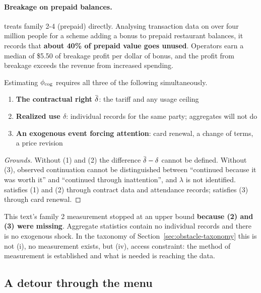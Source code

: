 \paragraph{Breakage on prepaid balances.}

\cite{nber2026pnbl} treats family 2-4 (prepaid) directly. Analysing transaction data on over
four million people for a scheme adding a bonus to prepaid restaurant balances, it records
that \textbf{about 40\% of prepaid value goes unused}. Operators earn a median of \$5.50 of
breakage profit per dollar of bonus, and the profit from breakage exceeds the revenue from
increased spending.

\begin{proposition}
\label{prop:phicog-requirements}
Estimating $\phi_{\rm cog}$ requires all three of the following simultaneously.
\begin{enumerate}[label=(\arabic*)]
\item \textbf{The contractual right $\dbar$}: the tariff and any usage ceiling
\item \textbf{Realized use $\delta$}: individual records for the same party; aggregates will not do
\item \textbf{An exogenous event forcing attention}: card renewal, a change of terms, a price revision
\end{enumerate}
\end{proposition}

\begin{proof}[Grounds]
Without (1) and (2) the difference $\dbar-\delta$ cannot be defined. Without (3), observed
continuation cannot be distinguished between ``continued because it was worth it'' and
``continued through inattention'', and $\lambda$ is not identified.
\cite{dellavigna2006} satisfies (1) and (2) through contract data and attendance records;
\cite{einav2025} satisfies (3) through card renewal.
\end{proof}

This text's family 2 measurement stopped at an upper bound \textbf{because (2) and (3) were
missing}. Aggregate statistics contain no individual records and there is no exogenous shock.
In the taxonomy of Section~\ref{sec:obstacle-taxonomy} this is not (i), no measurement exists,
but (iv), access constraint: the method of measurement is established and what is needed is
reaching the data.

\subsection{A detour through the menu}
\label{sec:phicog-detour}


